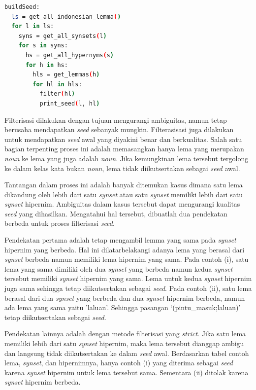 \begin{lstlisting}[caption={Algoritme pembentukan \textit{seed}}, language=bash]
buildSeed:
  ls = get_all_indonesian_lemma()
  for l in ls:
    syns = get_all_synsets(l)
    for s in syns:
      hs = get_all_hypernyms(s)
      for h in hs: 
        hls = get_lemmas(h)
        for hl in hls:
          filter(hl)
          print_seed(l, hl)
\end{lstlisting}

Filterisasi dilakukan dengan tujuan mengurangi ambiguitas, namun tetap berusaha mendapatkan \textit{seed} sebanyak mungkin. Filterasisasi juga dilakukan untuk mendapatkan \textit{seed} awal yang diyakini benar dan berkualitas. Salah satu bagian terpenting proses ini adalah memasangkan hanya lema yang merupakan \textit{noun} ke lema yang juga adalah \textit{noun}. Jika kemungkinan lema tersebut tergolong ke dalam kelas kata bukan \textit{noun}, lema tidak diikutsertakan sebagai \textit{seed} awal.

Tantangan dalam proses ini adalah banyak ditemukan kasus dimana satu lema dikandung oleh lebih dari satu \textit{synset} atau satu \textit{synset} memiliki lebih dari satu \textit{synset} hipernim. Ambiguitas dalam kasus tersebut dapat mengurangi kualitas \textit{seed} yang dihasilkan. Mengatahui hal tersebut, dibuatlah dua pendekatan berbeda untuk proses filterisasi \textit{seed}.

Pendekatan pertama adalah tetap mengambil lemma yang sama pada \textit{synset} hipernim yang berbeda. Hal ini dilatarbelakangi adanya lema yang berasal dari \textit{synset} berbeda namun memiliki lema hipernim yang sama. Pada contoh (i), satu lema yang sama dimiliki oleh dua \textit{synset} yang berbeda namun kedua \textit{synset} tersebut memiliki \textit{synset} hipernim yang sama. Lema untuk kedua \textit{synset} hipernim juga sama sehingga tetap diikutsertakan sebagai \textit{seed}. Pada contoh (ii), satu lema berasal dari dua \textit{synset} yang berbeda dan dua \textit{synset} hipernim berbeda, namun ada lema yang sama yaitu 'laluan'. Sehingga pasangan `(pintu\_masuk;laluan)' tetap diikutsertakan sebagai \textit{seed}.

Pendekatan lainnya adalah dengan metode filterisasi yang \textit{strict}. Jika satu lema memiliki lebih dari satu \textit{synset} hipernim, maka lema tersebut dianggap ambigu dan langsung tidak diikutsertakan ke dalam \textit{seed} awal. Berdasarkan tabel contoh lema, \textit{synset}, dan hipernimnya, hanya contoh (i) yang diterima sebagai \textit{seed} karena \textit{synset} hipernim untuk lema tersebut sama. Sementara (ii) ditolak karena \textit{synset} hipernim berbeda.

